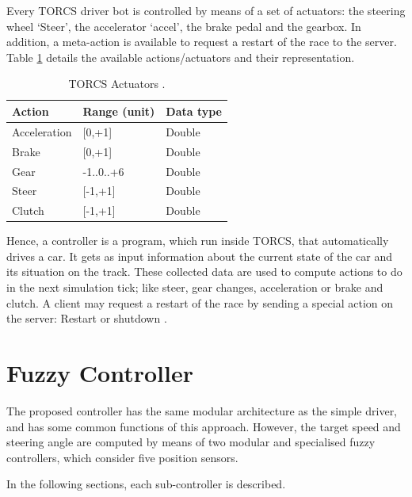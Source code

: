 \documentclass[runningheads,a4paper]{llncs}
\begin{document}
	Every TORCS driver bot is controlled by means of a set of actuators: the steering wheel `Steer', the accelerator `accel', the brake pedal and the gearbox. In addition, a meta-action is available to request a restart of the race to the server. Table \ref{tab2} details the available actions/actuators and their representation.
	
	\begin{table}[ht!]
		{\scriptsize
			{\centering
				\begin{tabular}{|p{3cm}|p{3 cm}|p{3 cm}|}
					\hline
					
					{\textbf{Action} }&
					{\textbf{Range} (unit)} &  
					{\textbf{Data type}}\\ 
					\hline
					Acceleration & [0,+1] & Double\\ 
					\hline
					Brake & [0,+1]	& Double\\
					\hline
					Gear & -1..0..+6	& Double\\
					\hline
					Steer & [-1,+1]	& Double\\
					\hline
					Clutch & [-1,+1]	& Double\\
					\hline
				\end{tabular}
			}
		}
		\caption{TORCS Actuators \cite{torcs2012}.}
		\label{tab2}
	\end{table}
	
	Hence, a controller is a program, which run inside TORCS, that automatically drives a car. It gets as input information about the current state of the car and its situation on the track. These collected data are used to compute actions to do in the next simulation tick; like steer, gear changes, acceleration or brake and clutch. A client may request a restart of the race by sending a special action on the server: Restart or shutdown \cite{manualTORCS}.
	
	
	\section{Fuzzy Controller}
	\label{sec:fuzzy_controller}
	
The proposed controller has the same modular architecture as the simple driver, and has some common functions of this approach. 
However, the target speed and steering angle are computed by means of two modular and specialised fuzzy controllers, which consider five position sensors.

In the following sections, each sub-controller is described.
\end{document}
